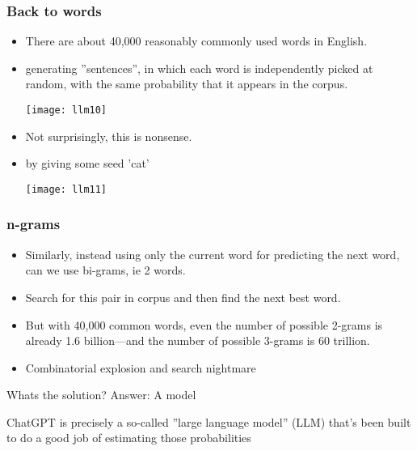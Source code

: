 \begin{frame}[fragile]\frametitle{Back to words}

\begin{itemize}
\item There are about 40,000 reasonably commonly used words in English.
\item generating ''sentences'', in which each word is independently picked at random, with the same probability that it appears in the corpus. 

\begin{center}
\texttt{[image: llm10]}
\end{center}

\item Not surprisingly, this is nonsense.
\item by giving some seed 'cat'

\begin{center}
\texttt{[image: llm11]}
\end{center}

\end{itemize}

\end{frame}

\begin{frame}[fragile]\frametitle{n-grams}

\begin{itemize}

\item Similarly, instead using only the current word for predicting the next word, can we use bi-grams, ie 2 words. 
\item Search for this pair in corpus and then find the next best word.
\item But with 40,000 common words, even the number of possible 2-grams is already 1.6 billion—and the number of possible 3-grams is 60 trillion.
\item Combinatorial explosion and search nightmare
\end{itemize}


Whats the solution? Answer: A model 

ChatGPT is precisely a so-called ''large language model'' (LLM) that’s been built to do a good job of estimating those probabilities

\end{frame}


